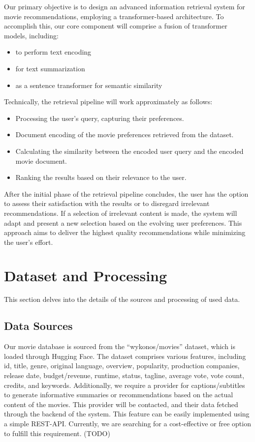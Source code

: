 \documentclass[12pt,a4paper]{article}
\begin{document}
  Our primary objective is to design an advanced information retrieval system for movie recommendations, employing a transformer-based architecture.
  To accomplish this, our core component will comprise a fusion of transformer models, including:
  \begin{itemize}
    \item to perform text encoding
    \item for text summarization
    \item as a sentence transformer for semantic similarity
  \end{itemize}

  \noindent Technically, the retrieval pipeline will work approximately as follows:
  \begin{itemize}
    \item Processing the user’s query, capturing their preferences.
    \item Document encoding of the movie preferences retrieved from the dataset.
    \item Calculating the similarity between the encoded user query and the encoded movie document.
    \item Ranking the results based on their relevance to the user.
  \end{itemize}

  \noindent After the initial phase of the retrieval pipeline concludes, the user has the option to assess their satisfaction with the results or to disregard irrelevant recommendations.
  If a selection of irrelevant content is made, the system will adapt and present a new selection based on the evolving user preferences.
  This approach aims to deliver the highest quality recommendations while minimizing the user’s effort.

  \section{Dataset and Processing}

  This section delves into the details of the sources and processing of used data.

  \subsection{Data Sources}

  Our movie database is sourced from the ``wykonos/movies'' dataset, which is loaded through Hugging Face.
  The dataset comprises various features, including id, title, genre, original language, overview, popularity, production companies, release date, budget/revenue, runtime, status, tagline, average vote, vote count, credits, and keywords.\newline\newline
  \noindent Additionally, we require a provider for captions/subtitles to generate informative summaries or recommendations based on the actual content of the movies.
  This provider will be contacted, and their data fetched through the backend of the system.
  This feature can be easily implemented using a simple REST-API. Currently, we are searching for a cost-effective or free option to fulfill this requirement. (TODO)
\end{document}
